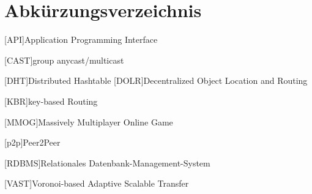 \chapter*{Abkürzungsverzeichnis}

\vspace{\topskip}


\begin{acronym}[xxxxxxxxxxxx]
	\setlength{\itemsep}{-\parsep}
	\setlength{\itemindent}{1.5em}
	[API]{Application Programming Interface}

	\vspace{\parsep} 
 [CAST]{group anycast/multicast}

	\vspace{\parsep}
	 [DHT]{Distributed Hashtable}
	[DOLR]{Decentralized Object Location and Routing}



	
	
\vspace{\parsep}
[KBR]{key-based Routing}




	\vspace{\parsep}
	[MMOG]{Massively Multiplayer Online Game}


	
	\vspace{\parsep}
	[p2p]{Peer2Peer}

	

	[RDBMS]{Relationales Datenbank-Management-System}
	
	


	\vspace{\parsep}
	[VAST]{Voronoi-based Adaptive Scalable Transfer}





\end{acronym}
